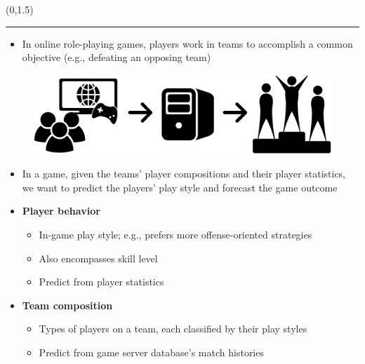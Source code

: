 \documentclass[a0]{a0poster}
\def\Head#1{\noindent{\LARGE\color{bluegray} #1}\bigskip}
\begin{document}
\begin{textblock}{7.0}(0,1.5)

\hrule\medskip
\Head{Introduction}

\begin{itemize}
  
  \item In online role-playing games, players work in teams to accomplish a common objective (e.g., defeating an opposing team)

\end{itemize}

\begin{figure}[!h]
  \centering
  \includegraphics[width=\textwidth]{intro-fig.pdf}
  \label{fig:intro}
\end{figure}

\begin{itemize}

  \item In a game, given the teams' player compositions and their player statistics, we want to predict the players' play style and forecast the game outcome

\end{itemize}

\begin{multicols}{2}
  
  \begin{itemize}
    \item \textbf{Player behavior}
    \begin{itemize}
      \item In-game play style; e.g., prefers more offense-oriented strategies
      \item Also encompasses skill level
      \item Predict from player statistics
    \end{itemize}

    \item \textbf{Team composition}
    \begin{itemize}
      \item Types of players on a team, each classified by their play styles
      \item Predict from game server database's match histories
    \end{itemize}
  \end{itemize}


\end{multicols}
\end{textblock}
\end{document}
